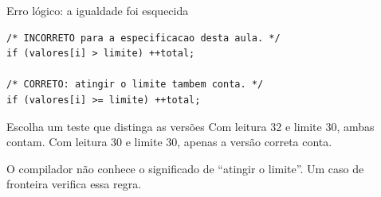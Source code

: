 \begin{frame}[fragile]{Erro lógico: a igualdade foi esquecida}
\begin{lstlisting}
/* INCORRETO para a especificacao desta aula. */
if (valores[i] > limite) ++total;

/* CORRETO: atingir o limite tambem conta. */
if (valores[i] >= limite) ++total;
\end{lstlisting}
\begin{block}{Escolha um teste que distinga as versões}
Com leitura 32 e limite 30, ambas contam. Com leitura 30 e limite 30, apenas a versão correta conta.
\end{block}
\small O compilador não conhece o significado de ``atingir o limite''. Um caso de fronteira verifica essa regra.
\end{frame}
